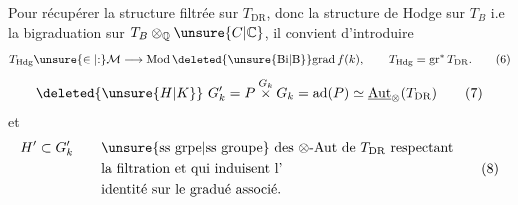 Pour récupérer la structure filtrée sur $T_{\mathrm{DR}}$,  donc la structure de Hodge sur $T_B$ i.e la bigraduation sur $T_B\otimes_{\mathbb Q}\unsure{C|\mathbb C}$, il convient d'introduire
\[
T_{\mathrm{Hdg}}\unsure{\in|\mathord{:}}\mathcal M\longrightarrow\operatorname{Mod}\deleted{\unsure{\mathrm{Bi}|\mathrm B}}\mathrm{grad}\,f(k),\qquad T_{\mathrm{Hdg}}=\operatorname{gr}^{*}T_{\mathrm{DR}}.\tag*{(6)}
\]
  
\[
\deleted{\unsure{H|K}}\ G'_k=P\overset{G_k}{\times}G_k=\operatorname{ad}(P)\simeq\underline{\operatorname{Aut}}_{\otimes}(T_{\mathrm{DR}})\tag*{(7)}
\]
 et
\[
\begin{aligned}
H'\subset G'_k\qquad &\text{\unsure{ss grpe|ss groupe} des $\otimes$-Aut de $T_{\mathrm{DR}}$ respectant}\\
&\text{la filtration et qui induisent l'}\\
&\text{identité sur le gradué associé.}
\end{aligned}\tag*{(8)}
\]
\endgroup
